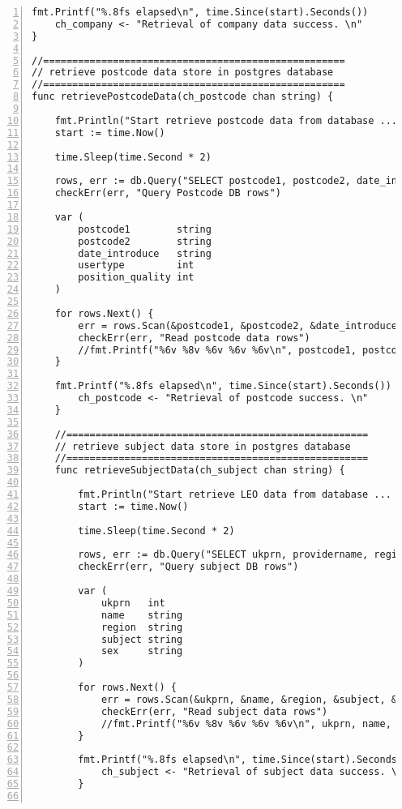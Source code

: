 \begin{lstlisting}[breaklines, frame=single, numbers=left, caption={Golang Concurrent Program Source Code}, label=commandline-02]
	fmt.Printf("%.8fs elapsed\n", time.Since(start).Seconds())
	ch_company <- "Retrieval of company data success. \n"
}

//====================================================
// retrieve postcode data store in postgres database
//====================================================
func retrievePostcodeData(ch_postcode chan string) {
	
	fmt.Println("Start retrieve postcode data from database ... ")
	start := time.Now()
	
	time.Sleep(time.Second * 2)
	
	rows, err := db.Query("SELECT postcode1, postcode2, date_introduce, usertype, position_quality FROM go_nspl LIMIT 50")
	checkErr(err, "Query Postcode DB rows")
	
	var (
		postcode1        string
		postcode2        string
		date_introduce   string
		usertype         int
		position_quality int
	)
	
	for rows.Next() {
		err = rows.Scan(&postcode1, &postcode2, &date_introduce, &usertype, &position_quality)
		checkErr(err, "Read postcode data rows")
		//fmt.Printf("%6v %8v %6v %6v %6v\n", postcode1, postcode2, date_introduce, usertype, position_quality)
	}
	
	fmt.Printf("%.8fs elapsed\n", time.Since(start).Seconds())
		ch_postcode <- "Retrieval of postcode success. \n"
	}
	
	//====================================================
	// retrieve subject data store in postgres database
	//====================================================
	func retrieveSubjectData(ch_subject chan string) {
	
		fmt.Println("Start retrieve LEO data from database ... ")
		start := time.Now()
		
		time.Sleep(time.Second * 2)
		
		rows, err := db.Query("SELECT ukprn, providername, region, subject, sex FROM go_subject LIMIT 50")
		checkErr(err, "Query subject DB rows")
		
		var (
			ukprn   int
			name    string
			region  string
			subject string
			sex     string
		)
		
		for rows.Next() {
			err = rows.Scan(&ukprn, &name, &region, &subject, &sex)
			checkErr(err, "Read subject data rows")
			//fmt.Printf("%6v %8v %6v %6v %6v\n", ukprn, name, region, subject, sex)
		}
		
		fmt.Printf("%.8fs elapsed\n", time.Since(start).Seconds())
			ch_subject <- "Retrieval of subject data success. \n"
		}
		

\end{lstlisting}
